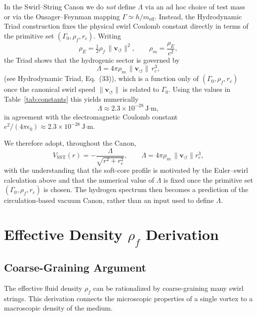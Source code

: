\documentclass[10pt,reprint,aps,onecolumn,nofootinbib]{revtex4-2}
\begin{document}
    In the Swirl–String Canon we do \emph{not} define $\Lambda$ via an ad hoc choice
    of test mass or via the Onsager–Feynman mapping $\Gamma \simeq h/m_{\text{eff}}$.
    Instead, the Hydrodynamic Triad construction fixes the physical swirl Coulomb
    constant directly in terms of the primitive set $(\Gamma_0,\rho_{\!f},r_c)$.
    Writing
    \begin{equation}
        \rho_{\!E} = \tfrac12 \rho_{\!f}\,\lVert \mathbf{v}_{\!\boldsymbol{\circlearrowleft}}\rVert^2,
        \qquad
        \rho_{\!m} = \frac{\rho_{\!E}}{c^2},
    \end{equation}
    the Triad shows that the hydrogenic sector is governed by
    \begin{equation}
        \Lambda = 4\pi \rho_{\!m}\,\lVert \mathbf{v}_{\!\boldsymbol{\circlearrowleft}}\rVert\, r_c^{3},
    \end{equation}
    (see Hydrodynamic Triad, Eq.~(33)), which is a function only of
    $(\Gamma_0,\rho_{\!f},r_c)$ once the canonical swirl speed
    $\lVert \mathbf{v}_{\!\boldsymbol{\circlearrowleft}}\rVert$ is related to $\Gamma_0$.
    Using the values in Table~\ref{tab:constants} this yields numerically
    \begin{equation}
        \Lambda \approx 2.3\times 10^{-28}\ \text{J·m},
    \end{equation}
    in agreement with the electromagnetic Coulomb constant
    $e^2/(4\pi\epsilon_0)\approx 2.3\times10^{-28}\ \text{J·m}$.

    We therefore adopt, throughout the Canon,
    \begin{equation}
        V_{\text{SST}}(r) = -\frac{\Lambda}{\sqrt{r^2 + r_c^2}},
        \qquad
        \Lambda = 4\pi \rho_{\!m}\,\lVert \mathbf{v}_{\!\boldsymbol{\circlearrowleft}}\rVert r_c^{3},
    \end{equation}
    with the understanding that the soft-core profile is motivated by the
    Euler–swirl calculation above and that the numerical value of $\Lambda$ is fixed
    once the primitive set $(\Gamma_0,\rho_{\!f},r_c)$ is chosen. The hydrogen
    spectrum then becomes a prediction of the circulation-based vacuum Canon,
    rather than an input used to define $\Lambda$.


    \section{Effective Density $\rho_f$ Derivation}
    \subsection{Coarse-Graining Argument}
        The effective fluid density $\rho_f$ can be rationalized by coarse-graining many swirl strings. This derivation connects the microscopic properties of a single vortex to a macroscopic density of the medium.
\end{document}
